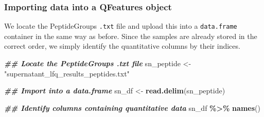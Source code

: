 \documentclass[9pt,a4paper,]{extarticle}
\newenvironment{Shaded}{\begin{snugshade}}{\end{snugshade}}
\newcommand{\DocumentationTok}[1]{\textcolor[rgb]{0.56,0.35,0.01}{\textbf{\textit{#1}}}}
\newcommand{\FunctionTok}[1]{\textcolor[rgb]{0.13,0.29,0.53}{\textbf{#1}}}
\newcommand{\NormalTok}[1]{#1}
\newcommand{\OtherTok}[1]{\textcolor[rgb]{0.56,0.35,0.01}{#1}}
\newcommand{\SpecialCharTok}[1]{\textcolor[rgb]{0.81,0.36,0.00}{\textbf{#1}}}
\newcommand{\StringTok}[1]{\textcolor[rgb]{0.31,0.60,0.02}{#1}}
\begin{document}
\subsubsection{Importing data into a QFeatures object}\label{importing-data-into-a-qfeatures-object}

We locate the PeptideGroups \texttt{.txt} file and upload this into a \texttt{data.frame}
container in the same way as before. Since the samples are already stored in the
correct order, we simply identify the quantitative columns by their indices.

\begin{Shaded}
\begin{Highlighting}[]
\DocumentationTok{\#\# Locate the PeptideGroups .txt file}
\NormalTok{sn\_peptide }\OtherTok{\textless{}{-}} \StringTok{"supernatant\_lfq\_results\_peptides.txt"}

\DocumentationTok{\#\# Import into a data.frame}
\NormalTok{sn\_df }\OtherTok{\textless{}{-}} \FunctionTok{read.delim}\NormalTok{(sn\_peptide)}

\DocumentationTok{\#\# Identify columns containing quantitative data}
\NormalTok{sn\_df }\SpecialCharTok{\%\textgreater{}\%}
  \FunctionTok{names}\NormalTok{()}
\end{Highlighting}
\end{Shaded}
\end{document}

